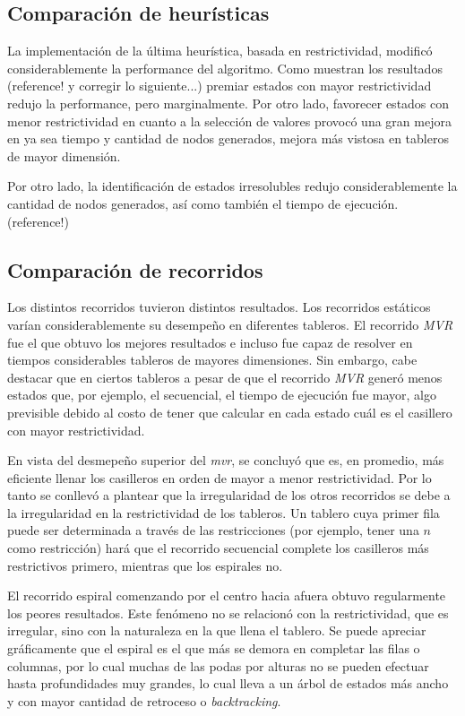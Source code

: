 \documentclass[%
    final,
    reprint,
    notitlepage,
    narroweqnarray,
    inline,
    twoside,
    invited
    ]{ieee}
\begin{document}
\subsection{Comparación de heurísticas}


\par La implementación de la última heurística, basada en restrictividad, modificó considerablemente la performance del algoritmo. 
Como muestran los resultados (reference! y corregir lo siguiente...) premiar estados con mayor restrictividad redujo la performance, pero marginalmente. Por 
otro lado, favorecer estados con menor restrictividad en cuanto a la selección de valores provocó una gran mejora en ya sea tiempo y cantidad de nodos 
generados, mejora más vistosa en tableros de mayor dimensión.
\par Por otro lado, la identificación de estados irresolubles redujo considerablemente la cantidad de nodos generados, así como también el tiempo de ejecución.
(reference!)

\subsection{Comparación de recorridos}

\par  Los distintos recorridos tuvieron distintos resultados. Los recorridos estáticos varían considerablemente su desempeño en diferentes tableros. El 
recorrido \textit{MVR} fue el que obtuvo los mejores resultados e incluso fue capaz de resolver en tiempos considerables tableros de mayores dimensiones. 
Sin embargo, cabe destacar que en ciertos tableros a pesar de que el recorrido \textit{MVR} generó menos estados que, por ejemplo, el secuencial, el tiempo de ejecución 
fue mayor, algo previsible debido al costo de tener que calcular en cada estado cuál es el casillero con mayor restrictividad. 
\par En vista del desmepeño superior 
del \textit{mvr}, se concluyó que es, en promedio, más eficiente llenar los casilleros en orden de mayor a menor restrictividad.
Por lo tanto se conllevó a plantear que la irregularidad de los otros recorridos se debe a la irregularidad en la restrictividad de los tableros. 
Un tablero cuya primer fila puede ser determinada a través de las restricciones (por ejemplo, tener una $n$ como restricción) hará que el recorrido secuencial 
complete los casilleros más restrictivos primero, mientras que los espirales no.
\par El recorrido espiral comenzando por el centro hacia afuera obtuvo regularmente los peores resultados. Este fenómeno no se relacionó con la restrictividad, 
que es irregular, sino con la naturaleza en la que llena el tablero. Se puede apreciar gráficamente que el espiral es el que más se demora en completar las filas 
o columnas, por lo cual muchas de las podas por alturas no se pueden efectuar hasta profundidades muy grandes, lo cual lleva a un árbol de estados más ancho y 
con mayor cantidad de retroceso o \textit{backtracking}.
\end{document}
